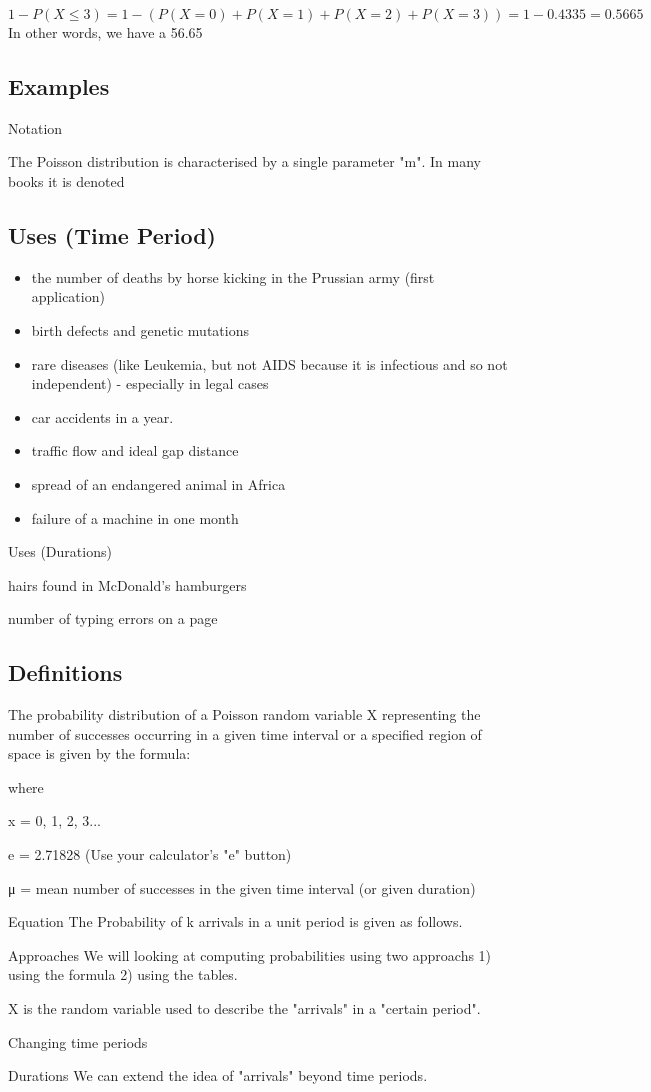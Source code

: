\documentclass[a4paper,12pt]{article}
\begin{document}
\[1 - P(X\leq3) = 1 - ( P(X=0) + P(X=1) + P(X=2) + P(X=3) ) = 1 - 0.4335 = 0.5665\]
In other words, we have a 56.65%



\subsection*{Examples}

Notation 

The Poisson distribution is characterised by a single parameter "m".
In many books it is denoted 


\subsection{Uses (Time Period)}
\begin{itemize}
\item the number of deaths by horse kicking in the Prussian army (first application)
\item birth defects and genetic mutations
\item rare diseases (like Leukemia, but not AIDS because it is infectious and so not independent) - especially in legal cases
\item car accidents in a year.
\item traffic flow and ideal gap distance
\item spread of an endangered animal in Africa
\item failure of a machine in one month
\end{itemize}

Uses (Durations)

hairs found in McDonald's hamburgers

number of typing errors on a page

\subsection{Definitions}

The probability distribution of a Poisson random variable X representing the number of successes occurring in a given time interval or a specified region of space is given by the formula:

where

x = 0, 1, 2, 3...

e = 2.71828 (Use your calculator's "e" button)

μ = mean number of successes in the given time interval (or given duration)

Equation 
The Probability of k arrivals in a unit period is given as follows.


Approaches
We will looking at computing probabilities using two approachs
1) using the formula
2) using the tables.

X is the random variable used to describe the "arrivals" in a "certain period".


Changing time periods


Durations
We can extend the idea of "arrivals" beyond time periods.

\end{document}
